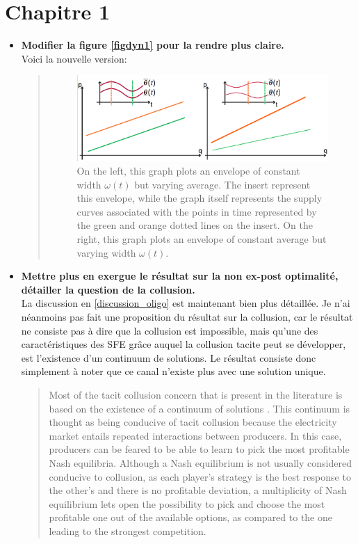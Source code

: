 \documentclass{article}
\begin{document}
\section{Chapitre 1}
\begin{itemize}
\item \textbf{Modifier la figure \ref{figdyn1} pour la rendre plus claire.}\\

Voici la nouvelle version:

\begin{quote}
\begin{figure}[h] 
\centering
\includegraphics[width=12cm]{figch1/uncertainty.png}
\caption{\small{On the left, this graph plots an envelope of constant width $\omega(t)$ but varying average. The insert represent this envelope, while the graph itself represents the supply curves associated with the points in time represented by the green and orange dotted lines on the insert. On the right, this graph plots an envelope of constant average but varying width $\omega(t)$. }}
\end{figure}
\end{quote}

\item \textbf{Mettre plus en exergue le résultat sur la non ex-post optimalité, détailler la question de la collusion.}\\

La discussion en \ref{discussion_oligo} est maintenant bien plus détaillée. Je n'ai néanmoins pas fait une proposition du résultat sur la collusion, car le résultat ne consiste pas à dire que la collusion est impossible, mais qu'une des caractéristiques des SFE grâce auquel la collusion tacite peut se développer, est l'existence d'un continuum de solutions. Le résultat consiste donc simplement à noter que ce canal n'existe plus avec une solution unique.

\begin{quote}
Most of the tacit collusion concern that is present in the literature is based on the existence of a continuum of solutions \cite{bolle1992supply}. This continuum is thought as being conducive of tacit collusion because the electricity market entails repeated interactions between producers. In this case, producers can be feared to be able to learn to pick the most profitable Nash equilibria. Although a Nash equilibrium is not usually considered conducive to collusion, as each player's strategy is the best response to the other's and there is no profitable deviation, a multiplicity of Nash equilibrium lets open the possibility to pick and choose the most profitable one out of the available options, as compared to the one leading to the strongest competition.\\


\end{quote}
\end{itemize}
\end{document}
